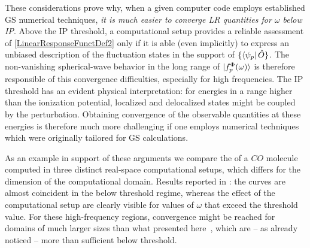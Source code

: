 \documentclass[reprint,aps,prb]{revtex4-1}
\newcommand{\op}[1]{\hat {#1}}
\begin{document}
These considerations prove why, when a given computer code employs established GS numerical techniques,
\emph{it is much easier to converge LR quantities for $\omega$ below IP}.
Above the IP threshold, a computational setup
provides a reliable assessment of \eqref{LinearResponseFunctDef2} only if it is able (even implicitly) to express an
unbiased description of the fluctuation states in the support of $\{\bra{\psi_p}\op O\}$.
The non-vanishing spherical-wave behavior in the long range of $\ket{f_p^\Phi(\omega)}$ is therefore responsible
of this convergence difficulties, especially for high frequencies.
The IP threshold has an evident physical interpretation: for energies in a range higher than the ionization potential,
localized and delocalized states might be coupled by the perturbation. Obtaining convergence of the observable quantities at these energies is therefore much more challenging if one employs
numerical techniques which were originally tailored for GS calculations.

As an example in support of these arguments we compare the  of a $CO$ molecule computed in three distinct real-space computational setups, which differs for the dimension of the computational domain.
Results reported in : the curves are almost coincident in the below threshold regime,
whereas the effect of the computational setup are clearly visible for values of  $\omega$ that exceed the threshold value.
For these high-frequency regions, convergence might be reached for domains of much larger sizes than what presented here~\cite{baroni2008},
which are -- as already noticed -- more than sufficient below threshold.
\end{document}
